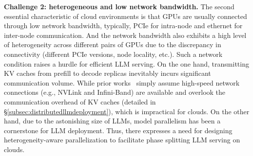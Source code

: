 
 
\noindent \textbf{{Challenge 2: heterogeneous and low network bandwidth.}}
The second essential characteristic of cloud environments is that GPUs are usually connected through low network bandwidth, typically, PCIe for intra-node and ethernet for inter-node communication. And the network bandwidth also exhibits a high level of heterogeneity across different pairs of GPUs due to the discrepancy in connectivity (different PCIe versions, node locality, etc.). 
Such a network condition raises a hurdle for efficient LLM serving.
On the one hand, transmitting KV caches from prefill to decode replicas inevitably incurs significant communication volume. 
While prior works~\cite{patel2023splitwise,zhong2024distserve} simply assume high-speed network connections (e.g., NVLink and Infini-Band) are available and overlook the communication overhead of KV caches (detailed in \S\ref{subsec:distributedllmdeployment}), which is impractical for clouds.
On the other hand, due to the astonishing size of LLMs, model parallelism has been a cornerstone for LLM deployment. Thus, there expresses a need for designing heterogeneity-aware parallelization to facilitate phase splitting LLM serving on clouds. 


